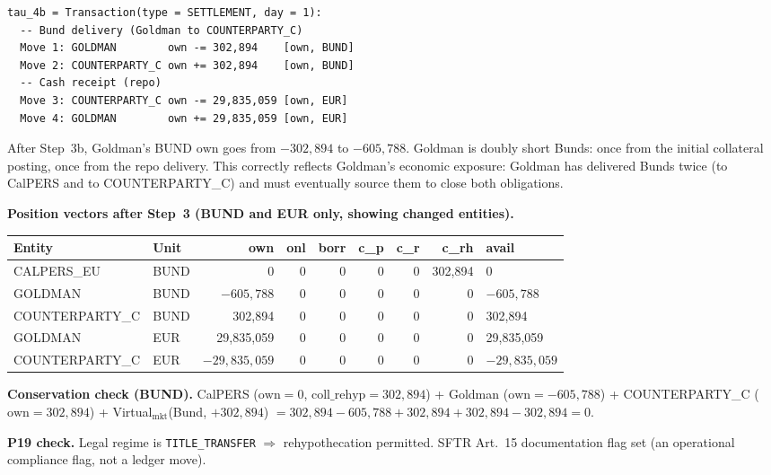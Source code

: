 \documentclass[11pt,a4paper]{article}
\begin{document}
\begin{lstlisting}
tau_4b = Transaction(type = SETTLEMENT, day = 1):
  -- Bund delivery (Goldman to COUNTERPARTY_C)
  Move 1: GOLDMAN        own -= 302,894    [own, BUND]
  Move 2: COUNTERPARTY_C own += 302,894    [own, BUND]
  -- Cash receipt (repo)
  Move 3: COUNTERPARTY_C own -= 29,835,059 [own, EUR]
  Move 4: GOLDMAN        own += 29,835,059 [own, EUR]
\end{lstlisting}

\noindent After Step~3b, Goldman's BUND $\mathrm{own}$ goes from $-302{,}894$ to $-605{,}788$. Goldman is doubly short Bunds: once from the initial collateral posting, once from the repo delivery. This correctly reflects Goldman's economic exposure: Goldman has delivered Bunds twice (to CalPERS and to COUNTERPARTY\_C) and must eventually source them to close both obligations.

\medskip
\noindent\textbf{Position vectors after Step~3 (BUND and EUR only, showing changed entities).}

\begin{center}\small
\begin{tabular}{l l r r r r r r l}
\toprule
\textbf{Entity} & \textbf{Unit} & own & onl & borr & c\_p & c\_r & c\_rh & avail \\
\midrule
CALPERS\_EU & BUND & 0 & 0 & 0 & 0 & 0 & 302{,}894 & 0 \\
GOLDMAN & BUND & $-605{,}788$ & 0 & 0 & 0 & 0 & 0 & $-605{,}788$ \\
COUNTERPARTY\_C & BUND & 302{,}894 & 0 & 0 & 0 & 0 & 0 & 302{,}894 \\
\midrule
GOLDMAN & EUR & 29{,}835{,}059 & 0 & 0 & 0 & 0 & 0 & 29{,}835{,}059 \\
COUNTERPARTY\_C & EUR & $-29{,}835{,}059$ & 0 & 0 & 0 & 0 & 0 & $-29{,}835{,}059$ \\
\bottomrule
\end{tabular}
\end{center}

\noindent\textbf{Conservation check (BUND).} CalPERS ($\mathrm{own}=0$, $\mathrm{coll\_rehyp}=302{,}894$) + Goldman ($\mathrm{own}=-605{,}788$) + COUNTERPARTY\_C ($\mathrm{own}=302{,}894$) + Virtual$_{\mathrm{mkt}}$(Bund, $+302{,}894$) $= 302{,}894 - 605{,}788 + 302{,}894 + 302{,}894 - 302{,}894 = 0$. \checkmark

\noindent\textbf{P19 check.} Legal regime is \texttt{TITLE\_TRANSFER} $\Rightarrow$ rehypothecation permitted. SFTR Art.~15 documentation flag set (an operational compliance flag, not a ledger move). \checkmark
\end{document}
